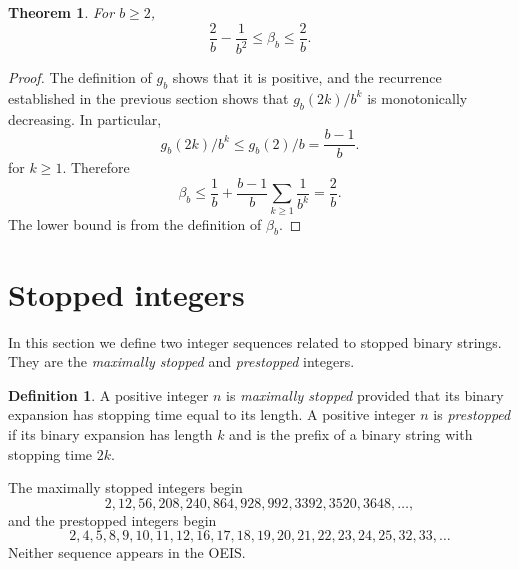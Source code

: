 \documentclass[12pt]{article}
\newtheorem{theorem}{Theorem}
\theoremstyle{definition}
\newtheorem{definition}{Definition}
\begin{document}
\begin{theorem}
    For $b \geq 2$,
    \begin{equation*}
        \frac{2}{b} - \frac{1}{b^2} \leq \beta_b \leq \frac{2}{b}.
    \end{equation*}
\end{theorem}

\begin{proof}
    The definition of $g_b$ shows that it is positive, and the recurrence
    established in the previous section shows that $g_b(2k) / b^k$ is
    monotonically decreasing. In particular,
    \begin{equation*}
        g_b(2k) / b^k \leq g_b(2) / b = \frac{b - 1}{b}.
    \end{equation*}
    for $k \geq 1$. Therefore
    \begin{equation*}
        \beta_b \leq \frac{1}{b} + \frac{b - 1}{b} \sum_{k \geq 1} \frac{1}{b^k}
        = \frac{2}{b}.
    \end{equation*}
    The lower bound is from the definition of $\beta_b$.
\end{proof}

\section{Stopped integers}
\label{sec:integers}

In this section we define two integer sequences related to stopped binary
strings. They are the \emph{maximally stopped} and \emph{prestopped} integers.

\begin{definition}
    A positive integer $n$ is \emph{maximally stopped} provided that its binary
    expansion has stopping time equal to its length. A positive integer $n$ is
    \emph{prestopped} if its binary expansion has length $k$ and is the prefix
    of a binary string with stopping time $2k$.
\end{definition}

The maximally stopped integers begin
\begin{equation*}
    2, 12, 56, 208, 240, 864, 928, 992, 3392, 3520, 3648, \dots,
\end{equation*}
and the prestopped integers begin
\begin{equation*}
    2, 4, 5, 8, 9, 10, 11, 12, 16, 17, 18, 19, 20, 21, 22, 23, 24, 25, 32, 33, \dots
\end{equation*}
Neither sequence appears in the OEIS.
\end{document}
